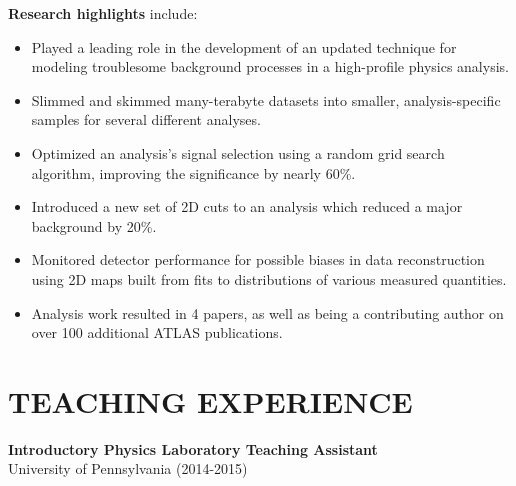\documentclass[10pt]{res}
\begin{document}
\begin{resume}

    {\bf Research highlights} include:
    \begin{itemize}
    \item Played a leading role in the development of an updated technique for modeling troublesome background processes in a high-profile physics analysis.
    \item Slimmed and skimmed many-terabyte datasets into smaller, analysis-specific samples for several different analyses.
    \item Optimized an analysis's signal selection using a random grid search algorithm, improving the significance by nearly 60\%.
    \item Introduced a new set of 2D cuts to an analysis which reduced a major background by 20\%.
    \item Monitored detector performance for possible biases in data reconstruction using 2D maps built from fits to distributions of various measured quantities.
    \item Analysis work resulted in 4 papers, as well as being a contributing author on over 100 additional ATLAS publications.
    \end{itemize}

\section{TEACHING EXPERIENCE}%
    {\bf Introductory Physics Laboratory Teaching Assistant}\\
    University of Pennsylvania (2014-2015)


\end{resume}
\end{document}
